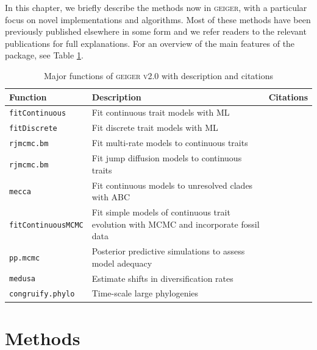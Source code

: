 In this chapter, we briefly describe the methods now in \textsc{geiger}, with a particular focus on novel implementations and algorithms. Most of these methods have been previously published elsewhere in some form and we refer readers to the relevant publications for full explanations. For an overview of the main features of the package, see Table \ref{tab:geiger-fxns}.

\begin{table}
\centering
  \begin{tabular}{| p{3.5cm} | p{5.5cm} | p{4cm} |}
    \hline
    Function & Description & Citations \\ \hline
    \texttt{fitContinuous} & Fit continuous trait models with ML & \citet{Felsenstein1973, Hansen1997, Pagel1997, Pagel1999, Blomberg2003, Hunt2006, Harmon2010, FitzJohn2012} \\ \hline
    \texttt{fitDiscrete} & Fit discrete trait models with ML & \citet{Pagel1994, Lewis2001, FitzJohn2009} \\ \hline
    \texttt{rjmcmc.bm} & Fit multi-rate models to continuous traits & \citet{Eastman2011} \\ \hline
    \texttt{rjmcmc.bm} & Fit jump diffusion models to continuous traits & \citet{Eastmanjump} \\ \hline
    \texttt{mecca} & Fit continuous models to unresolved clades with ABC & \citet{Slater2012MECCA} \\ \hline
     \texttt{fitContinuousMCMC} & Fit simple models of continuous trait evolution with MCMC and incorporate fossil data & \citet{Slater2012Fossil} \\ \hline
     \texttt{pp.mcmc} & Posterior predictive simulations to assess model adequacy & \citet{SlaterPennell} \\ \hline
    \texttt{medusa} & Estimate shifts in diversification rates & \citet{Alfaro2009} \\ \hline
     \texttt{congruify.phylo} & Time-scale large phylogenies & \citet{Eastman2013} \\ \hline
  \end{tabular}
\caption[Major features of geiger v2.0]{Major functions of \textsc{geiger v2.0} with description and citations}
\label{tab:geiger-fxns}
\end{table}



\section{Methods}
